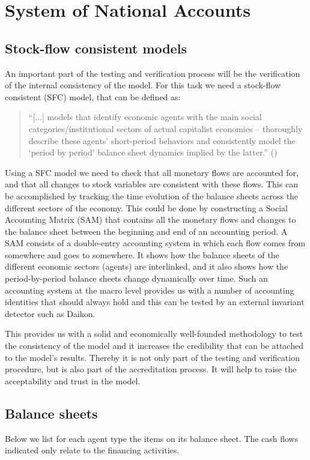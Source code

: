 \chapter{System of National Accounts}

\section{Stock-flow consistent models}
An important part of the testing and verification process will be the verification of the internal consistency of the model. For this task we need a stock-flow consistent (SFC) model, that can be defined as:
\begin{quote}
``[...] models that identify economic agents with the main social categories/institutional sectors of actual capitalist economies -- thoroughly describe these agents' short-period behaviors and consistently model the `period by period' balance sheet dynamics implied by the latter.'' (\citet[p. 2]{Macedo-e-Silva:2008})
\end{quote}
Using a SFC model we need to check that all monetary flows are accounted for, and that all changes to stock variables are consistent with these flows. This can be accomplished by tracking the time evolution of the balance sheets across the different sectors of the economy. This could be done by constructing a Social Accounting Matrix (SAM) that contains all the monetary flows and changes to the balance sheet between the beginning and end of an accounting period. A SAM consists of a double-entry accounting system in which each flow comes from somewhere and goes to somewhere. It shows how the balance sheets of the different economic sectors (agents) are interlinked, and it also shows how the period-by-period balance sheets change dynamically over time. Such an accounting system at the macro level provides us with a number of accounting identities that should always hold and this can be tested by an external invariant detector such as Daikon.

This provides us with a solid and economically well-founded methodology to test the consistency of the model and it increases the credibility that can be attached to the model's results. Thereby it is not only part of the testing and verification procedure, but is also part of the accreditation process. It will help to raise the acceptability and trust in the model.

\section{Balance sheets}
Below we list for each agent type the items on its balance sheet. The cash flows indicated only relate to the financing activities.

